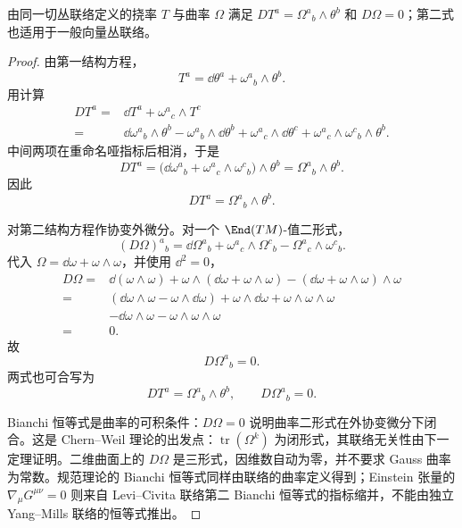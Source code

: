 \begin{theorem}
由同一切丛联络定义的挠率 $T$ 与曲率 $\Omega$ 满足 $DT^a=\Omega^a{}_b\wedge\theta^b$ 和 $D\Omega=0$；第二式也适用于一般向量丛联络。
\end{theorem}
\begin{proof}
由第一结构方程，
\[
T^a=\dd\theta^a+\omega^a{}_b\wedge\theta^b.
\]
用计算
\[
\begin{aligned}
D T^a
={}&\dd T^a+\omega^a{}_c\wedge T^c\\
={}&\dd\omega^a{}_b\wedge\theta^b
-\omega^a{}_b\wedge\dd\theta^b
+\omega^a{}_c\wedge\dd\theta^c
+\omega^a{}_c\wedge\omega^c{}_b\wedge\theta^b.
\end{aligned}
\]
中间两项在重命名哑指标后相消，于是
\[
D T^a
=\bigl(\dd\omega^a{}_b+\omega^a{}_c\wedge\omega^c{}_b\bigr)\wedge\theta^b
=\Omega^a{}_b\wedge\theta^b.
\]
因此
\begin{equation}\label{eq:math-dg-bianchi-first}
{D T^a=\Omega^a{}_b\wedge\theta^b.}
\end{equation}

对第二结构方程作协变外微分。对一个 $\End(TM)$-值二形式，
\[
(D\Omega)^a{}_b
=\dd\Omega^a{}_b
+\omega^a{}_c\wedge\Omega^c{}_b
-\Omega^a{}_c\wedge\omega^c{}_b.
\]
代入 $\Omega=\dd\omega+\omega\wedge\omega$，并使用 $\dd^2=0$，
\[
\begin{aligned}
D\Omega
={}&\dd(\omega\wedge\omega)
+\omega\wedge(\dd\omega+\omega\wedge\omega)
-(\dd\omega+\omega\wedge\omega)\wedge\omega\\
={}&(\dd\omega\wedge\omega-\omega\wedge\dd\omega)
+\omega\wedge\dd\omega+\omega\wedge\omega\wedge\omega\\
&-\dd\omega\wedge\omega-\omega\wedge\omega\wedge\omega\\
={}&0.
\end{aligned}
\]
故
\begin{equation}\label{eq:math-dg-bianchi-second}
{D\Omega^a{}_b=0.}
\end{equation}
两式也可合写为
\begin{equation}\label{eq:math-dg-synthesis-bianchi}
D T^a=\Omega^a{}_b\wedge\theta^b,
\qquad
D\Omega^a{}_b=0.
\end{equation}

Bianchi 恒等式是曲率的可积条件：$D\Omega=0$ 说明曲率二形式在外协变微分下闭合。这是 Chern--Weil 理论的出发点：$\operatorname{tr}(\Omega^k)$ 为闭形式，其联络无关性由下一定理证明。二维曲面上的 $D\Omega$ 是三形式，因维数自动为零，并不要求 Gauss 曲率为常数。规范理论的 Bianchi 恒等式同样由联络的曲率定义得到；Einstein 张量的 $\nabla_\mu G^{\mu\nu}=0$ 则来自 Levi--Civita 联络第二 Bianchi 恒等式的指标缩并，不能由独立 Yang--Mills 联络的恒等式推出。
\end{proof}

